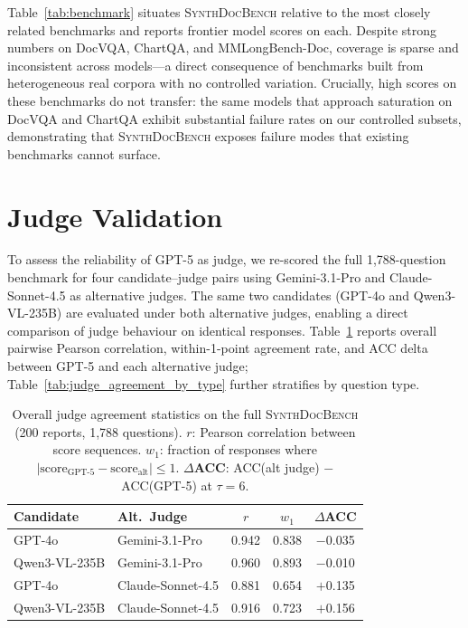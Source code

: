 \documentclass{article} %
\begin{document}
Table~\ref{tab:benchmark} situates \textsc{SynthDocBench} relative to the most closely
related benchmarks and reports frontier model scores on each.
Despite strong numbers on DocVQA, ChartQA, and MMLongBench-Doc, coverage is sparse and
inconsistent across models---a direct consequence of benchmarks built from heterogeneous
real corpora with no controlled variation.
Crucially, high scores on these benchmarks do not transfer: the same models that
approach saturation on DocVQA and ChartQA exhibit substantial failure rates on our
controlled subsets, demonstrating that \textsc{SynthDocBench} exposes failure modes
that existing benchmarks cannot surface.


\section{Judge Validation}
\label{app:judge_validation}

To assess the reliability of GPT-5 as judge, we re-scored the full 1{,}788-question benchmark for four candidate--judge pairs using Gemini-3.1-Pro and Claude-Sonnet-4.5 as alternative judges. The same two candidates (GPT-4o and Qwen3-VL-235B) are evaluated under both alternative judges, enabling a direct comparison of judge behaviour on identical responses. Table~\ref{tab:judge_agreement} reports overall pairwise Pearson correlation, within-1-point agreement rate, and ACC delta between GPT-5 and each alternative judge; Table~\ref{tab:judge_agreement_by_type} further stratifies by question type.

\begin{table}[htbp]
\centering
\small
\caption{Overall judge agreement statistics on the full \textsc{SynthDocBench} (200 reports, 1{,}788 questions). \textbf{$r$}: Pearson correlation between score sequences. \textbf{$w_1$}: fraction of responses where $|\text{score}_\text{GPT-5} - \text{score}_\text{alt}| \leq 1$. \textbf{$\Delta$ACC}: ACC(alt judge) $-$ ACC(GPT-5) at $\tau{=}6$.}
\label{tab:judge_agreement}
\begin{tabular}{@{}llccc@{}}
\toprule
\textbf{Candidate} & \textbf{Alt.\ Judge} & $r$ & $w_1$ & $\Delta$\textbf{ACC} \\
\midrule
GPT-4o           & Gemini-3.1-Pro    & 0.942 & 0.838 & $-$0.035 \\
Qwen3-VL-235B    & Gemini-3.1-Pro    & 0.960 & 0.893 & $-$0.010 \\
\midrule
GPT-4o           & Claude-Sonnet-4.5 & 0.881 & 0.654 & $+$0.135 \\
Qwen3-VL-235B    & Claude-Sonnet-4.5 & 0.916 & 0.723 & $+$0.156 \\
\bottomrule
\end{tabular}
\end{table}
\end{document}
